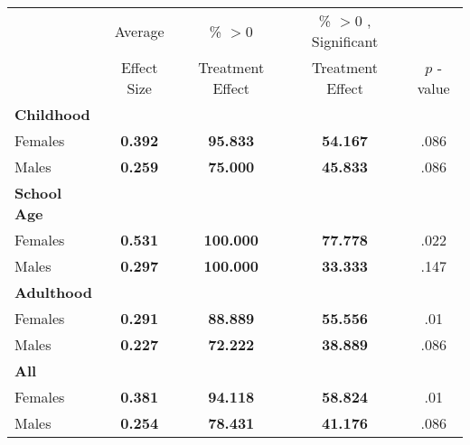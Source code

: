 \begin{tabular}{l c c c c}
\toprule
 & Average & \% $ >0 $ & \% $ >0 $ , Significant & \citet{Rosenbaum_2005_Distribution_JRSS} \\
 & Effect Size & Treatment Effect & Treatment Effect & $ p $ -value \\
\midrule
\textbf{Childhood} & & & & \\
\quad Females &  \textbf{    0.392} & \textbf{   95.833} & \textbf{   54.167} & .086 \\
\quad Males &  \textbf{    0.259} & \textbf{   75.000} & \textbf{   45.833} & .086 \\
\midrule
\textbf{School Age} & & & & \\
\quad Females &  \textbf{    0.531} & \textbf{  100.000} & \textbf{   77.778} & .022 \\
\quad Males &  \textbf{    0.297} & \textbf{  100.000} & \textbf{   33.333} & .147 \\
\midrule
\textbf{Adulthood} & & & & \\
\quad Females &  \textbf{    0.291} & \textbf{   88.889} & \textbf{   55.556} & .01 \\
\quad Males &  \textbf{    0.227} & \textbf{   72.222} & \textbf{   38.889} & .086 \\
\midrule
\textbf{All} & & & & \\
\quad Females &  \textbf{    0.381} & \textbf{   94.118} & \textbf{   58.824} & .01 \\
\quad Males &  \textbf{    0.254} & \textbf{   78.431} & \textbf{   41.176} & .086 \\
\bottomrule
\end{tabular}
